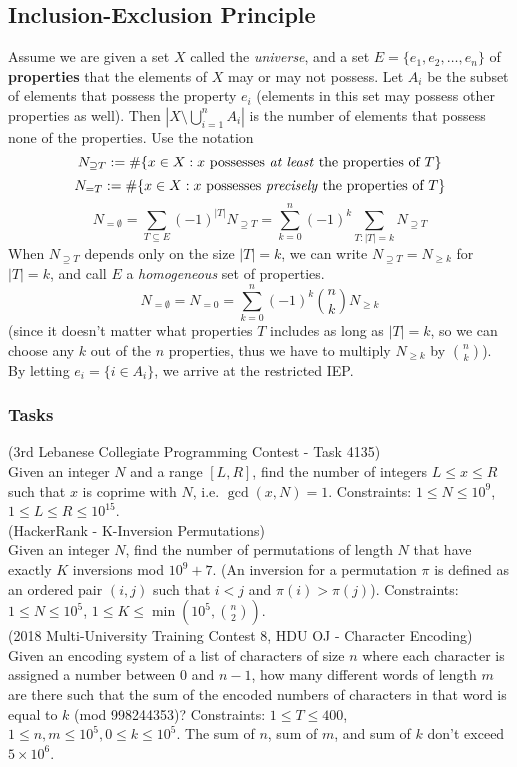 \documentclass[12pt]{extarticle}
\begin{document}
\subsection*{Inclusion-Exclusion Principle}
Assume we are given a set $X$ called the \emph{universe}, and a set $E=\{e_{1},e_{2},\dots,e_{n}\}$ of \textbf{properties} that the elements of $X$ may or may not possess. Let $A_{i}$ be the subset of elements that possess the property $e_{i}$ (elements in this set may possess other properties as well). Then $| X\setminus \bigcup_{i=1}^{n}A_{i} |$ is the number of elements that possess none of the properties. Use the notation $$N_{\supseteq T}:=\text{\#}\{x\in X:x \text{ possesses \emph{at least} the properties of }T\}$$
$$N_{= T}:=\text{\#}\{x\in X:x \text{ possesses \emph{precisely} the properties of }T\}$$
$$N_{=\emptyset}=\sum_{T\subseteq E}(-1)^{|T|}N_{\supseteq T}=\sum_{k=0}^{n}(-1)^{k}\sum_{T:|T|=k}N_{\supseteq T}$$
When $N_{\supseteq T}$ depends only on the size $|T|=k$, we can write $N_{\supseteq T}=N_{\geq k}$ for $|T|=k$, and call $E$ a \emph{homogeneous} set of properties. 
$$N_{=\emptyset}=N_{=0}=\sum_{k=0}^{n}(-1)^{k}{n\choose k} N_{\geq k}$$
(since it doesn't matter what properties $T$ includes as long as $|T|=k$, so we can choose any $k$ out of the $n$ properties, thus we have to multiply $N_{\geq k}$ by $n\choose k$).
By letting $e_{i}=\{i\in A_{i}\}$, we arrive at the restricted IEP.
\subsubsection*{Tasks} 
(3rd Lebanese Collegiate Programming Contest - Task 4135) \\ 
Given an integer $N$ and a range $[L, R]$, find the number of integers $L\leq x\leq R$ such that $x$ is coprime with $N$, i.e. $\gcd(x, N) = 1$. Constraints: $1\leq N \leq 10^{9}$, $1\leq L\leq R\leq 10^{15}$.\\

\noindent (HackerRank - K-Inversion Permutations)\\
Given an integer $N$, find the number of permutations of length $N$ that have exactly $K$ inversions mod $10^{9}+7$. (An inversion for a permutation $\pi$ is defined as an ordered pair $(i, j)$ such that $i<j$ and $\pi(i)>\pi(j)$). Constraints: $1\leq N\leq 10^{5}$, $1\leq K\leq \min(10^{5},{n\choose 2})$.\\

\noindent (2018 Multi-University Training Contest 8, HDU OJ - Character Encoding)\\
Given an encoding system of a list of characters of size $n$ where each character is assigned a number between 0 and $n-1$, how many different words of length $m$ are there such that the sum of the encoded numbers of characters in that word is equal to $k$ (mod 998244353)? Constraints: $1\leq T\leq 400$, $1\leq n,m\leq 10^{5}, 0\leq k\leq 10^{5}$. The sum of $n$, sum of $m$, and sum of $k$ don't exceed $5\times 10^{6}$.\\
\end{document}
